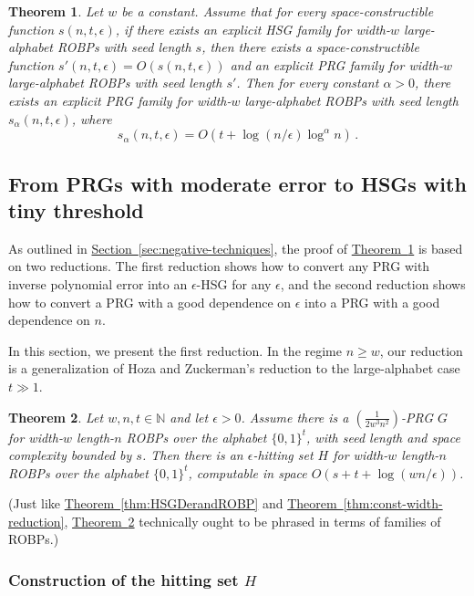 \documentclass[11pt]{article}
\numberwithin{equation}{section}
\newtheorem{theorem}{Theorem}[section]
\theoremstyle{definition}
\theoremstyle{plain}
\newcommand{\N}{\mathbb N}
\newcommand{\expref}[2]{\hyperref[#2]{#1~\ref{#2}}}
\begin{document}
\begin{theorem} \label{thm:negative}
Let $w$ be a constant. Assume that for every space-constructible function $s(n, t, \epsilon)$, if there exists an explicit HSG family for width-$w$ large-alphabet ROBPs with seed length $s$, then there exists a space-constructible function $s'(n, t, \epsilon) = O(s(n, t, \epsilon))$ and an explicit PRG family for width-$w$ large-alphabet ROBPs with seed length $s'$. Then for every constant $\alpha > 0$, there exists an explicit PRG family for width-$w$ large-alphabet ROBPs with seed length $s_\alpha(n, t, \epsilon)$, where
$$
s_{\alpha}(n, t, \epsilon) = O(t + \log(n/\epsilon) \log^\alpha n)\,.
$$
\end{theorem}

\subsection{From PRGs with moderate error to HSGs with tiny threshold}

As outlined in \expref{Section}{sec:negative-techniques}, the proof of \expref{Theorem}{thm:negative} is based on two reductions. The first reduction shows how to convert any PRG with inverse polynomial error into an $\epsilon$-HSG for any $\epsilon$, and the second reduction shows how to convert a PRG with a good dependence on $\epsilon$ into a PRG with a good dependence on $n$.

In this section, we present the first reduction. In the regime $n \geq w$, our reduction is a generalization of Hoza and Zuckerman's reduction \cite{HZ20} to the large-alphabet case $t \gg 1$.

\begin{theorem} \label{thm:large-alphabet-hz}
Let $w, n, t \in \N$ and let $\epsilon > 0$. Assume there is a $(\frac{1}{2w^3 n^2})$-PRG $G$ for width-$w$ length-$n$ ROBPs over the alphabet $\{0, 1\}^t$, with seed length and space complexity bounded by $s$. Then there is an $\epsilon$-hitting set $H$ for width-$w$ length-$n$ ROBPs over the alphabet $\{0, 1\}^t$, computable in space $O(s + t + \log(wn/\epsilon))$.
\end{theorem}

(Just like \expref{Theorem}{thm:HSGDerandROBP} and \expref{Theorem}{thm:const-width-reduction}, \expref{Theorem}{thm:large-alphabet-hz} technically ought to be phrased in terms of families of ROBPs.)

\subsubsection{Construction of the hitting set $H$}
\end{document}
